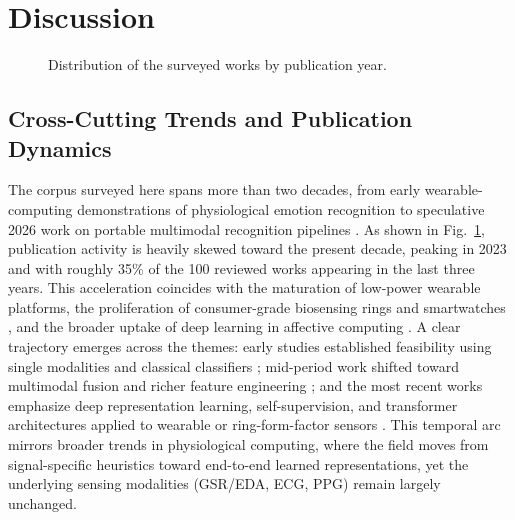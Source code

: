 \section{Discussion}\label{sec:discussion}
\begin{figure}[!t]
\centering
{}
\caption{Distribution of the surveyed works by publication year.}
\label{fig:years}
\end{figure}
\subsection{Cross-Cutting Trends and Publication Dynamics}
The corpus surveyed here spans more than two decades, from early wearable-computing demonstrations of physiological emotion recognition \cite{lisetti2004noninvasive} to speculative 2026 work on portable multimodal recognition pipelines \cite{darabkh2026exploring,site2026emotion,c2026survey,shahid2026comparative,noori2025sensitivity}. As shown in Fig.~\ref{fig:years}, publication activity is heavily skewed toward the present decade, peaking in 2023 and with roughly 35\% of the 100 reviewed works appearing in the last three years. This acceleration coincides with the maturation of low-power wearable platforms, the proliferation of consumer-grade biosensing rings and smartwatches \cite{wang2025computing,lindstrom2025wearable,li2024comparison,shahid2026comparative}, and the broader uptake of deep learning in affective computing \cite{dar2020cnn,zou2024emotion,wu2023transformer,li2025transformer}. A clear trajectory emerges across the themes: early studies established feasibility using single modalities and classical classifiers \cite{lisetti2004noninvasive,vijaya2013galvanic,setyohadi2018galvanic}; mid-period work shifted toward multimodal fusion and richer feature engineering \cite{wei2018emotion,ayata2020emotion,pinto2020multimodal,dessai2024multimodal}; and the most recent works emphasize deep representation learning, self-supervision, and transformer architectures applied to wearable or ring-form-factor sensors \cite{dissanayake2022sigrep,wu2023transformer,li2025transformer,sumanth2025bilstm}. This temporal arc mirrors broader trends in physiological computing, where the field moves from signal-specific heuristics toward end-to-end learned representations, yet the underlying sensing modalities (GSR/EDA, ECG, PPG) remain largely unchanged.

